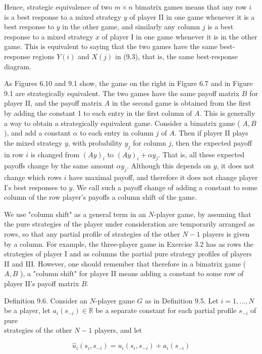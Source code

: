 \documentclass[12pt]{article}
\begin{document}
Hence, strategic equivalence of two $m \times n$ bimatrix games means that any row $i$ is a best response to a mixed strategy $y$ of player II in one game whenever it is a best response to $y$ in the other game, and similarly any column $j$ is a best response to a mixed strategy $x$ of player I in one game whenever it is in the other game. This is equivalent to saying that the two games have the same best-response regions $Y(i)$ and $X(j)$ in (9.3), that is, the same best-response diagram.

As Figures 6.10 and 9.1 show, the game on the right in Figure 6.7 and in Figure 9.1 are strategically equivalent. The two games have the same payoff matrix $B$ for player II, and the payoff matrix $A$ in the second game is obtained from the first by adding the constant 1 to each entry in the first column of $A$. This is generally a way to obtain a strategically equivalent game. Consider a bimatrix game ( $A, B$ ), and add a constant $\alpha$ to each entry in column $j$ of $A$. Then if player II plays the mixed strategy $y$, with probability $y_{j}$ for column $j$, then the expected payoff in row $i$ is changed from $(A y)_{i}$ to $(A y)_{i}+\alpha y_{j}$. That is, all these expected payoffs change by the same amount $\alpha y_{j}$. Although this depends on $y$, it does not change which rows $i$ have maximal payoff, and therefore it does not change player I's best responses to $y$. We call such a payoff change of adding a constant to some column of the row player's payoffs a column shift of the game.

We use "column shift" as a general term in an $N$-player game, by assuming that the pure strategies of the player under consideration are temporarily arranged as rows, so that any partial profile of strategies of the other $N-1$ players is given by a column. For example, the three-player game in Exercise 3.2 has as rows the strategies of player I and as columns the partial pure strategy profiles of players II and III. However, one should remember that therefore in a bimatrix game ( $A, B$ ), a "column shift" for player II means adding a constant to some row of player II's payoff matrix $B$.

Definition 9.6. Consider an $N$-player game $G$ as in Definition 9.5. Let $i=1, \ldots, N$ be a player, let $a_{i}\left(s_{-i}\right) \in \mathbb{R}$ be a separate constant for each partial profile $s_{-i}$ of pure\\
strategies of the other $N-1$ players, and let

$$
\hat{u}_{i}\left(s_{i}, s_{-i}\right)=u_{i}\left(s_{i}, s_{-i}\right)+a_{i}\left(s_{-i}\right)
$$
\end{document}
